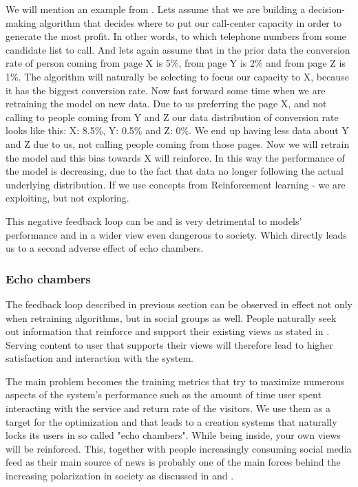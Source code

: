 We will mention an example from \cite{towardsdatascience_negative_feedback_loop}. Lets assume that we are building a decision-making algorithm that decides where to put our call-center capacity in order to generate the most profit. In other words, to which telephone numbers from some candidate list to call. And lets again assume that in the prior data the conversion rate of person coming from page X is 5\%, from page Y is 2\% and from page Z is 1\%. The algorithm will naturally be selecting to focus our capacity to X, because it has the biggest conversion rate. Now fast forward some time when we are retraining the model on new data. Due to us preferring the page X, and not calling to people coming from Y and Z our data distribution of conversion rate looks like this: X: 8.5\%, Y: 0.5\% and Z: 0\%. We end up having less data about Y and Z due to us, not calling people coming from those pages. Now we will retrain the model and this bias towards X will reinforce. In this way the performance of the model is decreasing, due to the fact that
data no longer following the actual underlying distribution. If we use concepts
from Reinforcement learning - we are exploiting, but not exploring.

This negative feedback loop can be and is very detrimental to models' performance and in a wider view even dangerous to society. Which directly leads us to a second adverse effect of echo chambers.

\subsubsection{Echo chambers}
The feedback loop described in previous section can be observed in effect not only when retraining algorithms, but in social groups as well. People naturally seek out information that reinforce and support their existing views as stated in \cite{garrett2009_reinforcing_opinion}. Serving content to user that supports their views will therefore lead to higher satisfaction and interaction with the system.

The main problem becomes the training metrics that try to maximize numerous aspects of the system's performance such as the amount of time user spent interacting with the service and return rate of the visitors. We use them as a target for the optimization and that leads to a creation systems that naturally locks its users in so called "echo chambers".
While being inside, your own views will be reinforced. This, together with people increasingly consuming social media feed as their main source of news is probably one of the main forces behind the increasing polarization in society as discussed in \cite{echo_chambers_effect_2021} and \cite{echo_chambers_effect_twitter_2015}.

